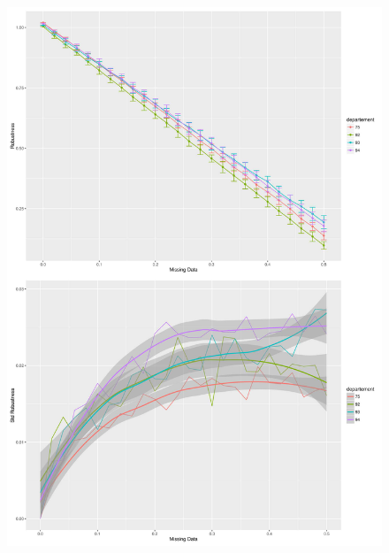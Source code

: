 \begin{figure}
\includegraphics[width=\linewidth,height=0.85\textheight]{Figures/Final/B-robustness-sensitivity.jpg}

\end{figure}
